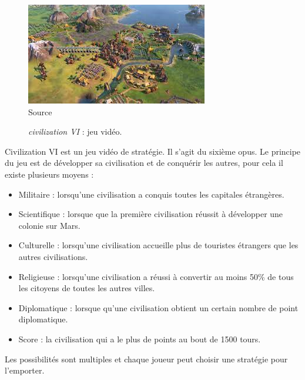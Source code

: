 \begin{figure}[H]
    \centering
    \includegraphics[scale=0.8]{data/civilization.jpeg}\\
    Source 
    \caption{\textit{civilization VI} : jeu vidéo.}
\end{figure}
Civilization VI est un jeu vidéo de stratégie. Il s'agit du sixième opus.
Le principe du jeu est de développer sa civilisation et de conquérir les autres, pour cela il existe plusieurs moyens :
\begin{itemize}
    \item Militaire : lorsqu'une civilisation a conquis toutes les capitales étrangères.
    \item Scientifique : lorsque que la première civilisation réussit à développer une colonie sur Mars.
    \item Culturelle : lorsqu'une civilisation accueille plus de touristes étrangers que les autres civilisations.
    \item Religieuse : lorsqu'une civilisation a réussi à convertir au moins 50\% de tous les citoyens de toutes les autres villes.
    \item Diplomatique : lorsque qu'une civilisation obtient un certain nombre de point diplomatique.
    \item Score : la civilisation qui a le plus de points au bout de 1500 tours.
\end{itemize}
Les possibilités sont multiples et chaque joueur peut choisir une stratégie pour l'emporter.


